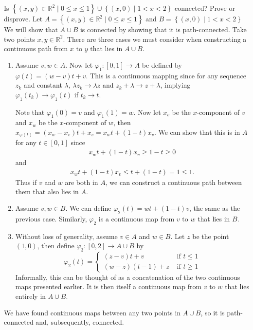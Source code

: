 \documentclass[10pt]{amsart}
\theoremstyle{plain}
\newenvironment{exercise}[1]{%
  \renewcommand\themanualtheoreminner{#1}%
  \manualtheoreminner
}{\endmanualtheoreminner}
\theoremstyle{definition}
\begin{document}
\begin{exercise}{3.5.2}
	Is $\left\{ (x,y) \in \mathbb{R}^2 \;|\; 0 \leq x \leq 1 \right\} \cup \left\{ (x,0) \;|\; 1<x<2 \right\}$ connected? Prove or disprove.
	\hrulefill
\end{exercise}
Let $A = \left\{ (x,y) \in \mathbb{R}^2 \;|\; 0 \leq x \leq 1 \right\}$ and $B = \left\{ (x,0) \;|\; 1<x<2 \right\}$ We will show that $A \cup B$ is connected by showing that it is path-connected. Take two points $x,y \in \mathbb{R}^2$. There are three cases we must consider when constructing a continuous path from $x$ to $y$ that lies in $A \cup B$.

\begin{enumerate}
	\item Assume $v,w \in A$. Now let $\varphi_1:[0,1]\to A$ be defined by $\varphi(t) = (w-v)t + v$. This is a continuous mapping since for any sequence $z_k$ and constant $\lambda$, $\lambda z_k \to \lambda z$ and $z_k + \lambda \to z + \lambda$, implying $\varphi_1(t_k) \to \varphi_1(t)$ if $t_k \to t$.

		Note that $\varphi_1(0) = v$ and $\varphi_1(1) = w$. Now let $x_v$ be the $x$-component of $v$ and $x_w$ be the $x$-component of $w$, then $x_{\varphi(t)} = (x_w - x_v)t + x_v = x_w t + (1-t) x_v$. We can show that this is in $A$ for any $t \in [0,1]$ since
		\begin{gather*}
			x_w t + (1-t) x_v \geq 1 - t \geq 0
		\end{gather*}
		and
		\begin{gather*}
			x_w t + (1-t) x_v \leq t + (1-t) = 1 \leq 1.
		\end{gather*}
		Thus if $v$ and $w$ are both in $A$, we can construct a continuous path between them that also lies in $A$.

	\item Assume $v,w \in B$. We can define $\varphi_2(t) = wt + (1-t)v$, the same as the previous case. Similarly, $\varphi_2$ is a continuous map from $v$ to $w$ that lies in $B$.

	\item Without loss of generality, assume $v \in A$ and $w \in B$. Let $z$ be the point $(1,0)$, then define $\varphi_3:[0,2]\to A \cup B$ by
		\[
			\varphi_2(t) =
			\begin{cases}
				(z-v) t + v & \text{ if } t \leq 1 \\
				(w-z)(t-1) + z & \text{ if } t \geq 1
			\end{cases}
		\] 
		Informally, this can be thought of as a concatenation of the two continuous maps presented earlier. It is then itself a continuous map from $v$ to $w$ that lies entirely in $A \cup B$.
\end{enumerate}
We have found continuous maps between any two points in $A \cup B$, so it is path-connected and, subsequently, connected.
\end{document}
